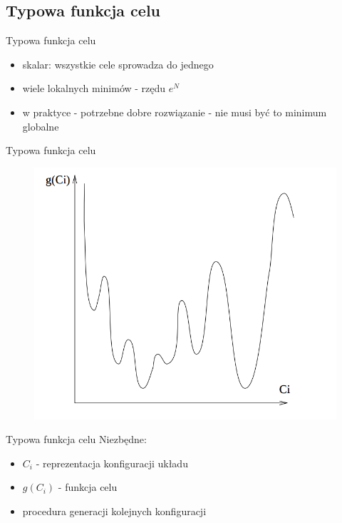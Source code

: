 \subsection{Typowa funkcja celu}
	\begin{frame}{Typowa funkcja celu}
		\begin{itemize}
			\item skalar: wszystkie cele sprowadza do jednego
			\item wiele lokalnych minimów - rzędu $e^N$
			\item w praktyce - potrzebne dobre rozwiązanie - nie musi być to minimum globalne
		\end{itemize}

	\end{frame}


	\begin{frame}{Typowa funkcja celu}
		\begin{figure}
			\includegraphics[height=0.9\textheight]{img/18/target_fun}
		\end{figure}
	\end{frame}


	\begin{frame}{Typowa funkcja celu}
		Niezbędne:
		\begin{itemize}
			\item $C_i$ - reprezentacja konfiguracji układu
			\item $g(C_i)$ - funkcja celu
			\item procedura generacji kolejnych konfiguracji
		\end{itemize}
	\end{frame}

